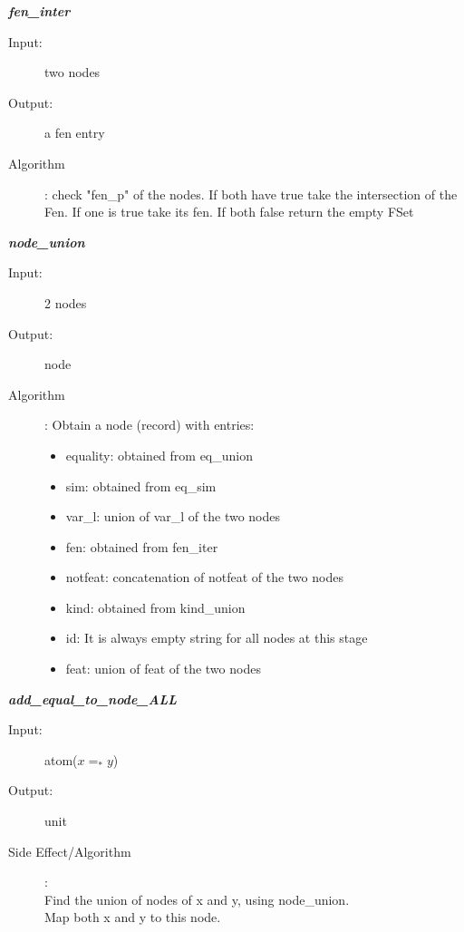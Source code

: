 \documentclass[12pt]{article}
\begin{document}
\begin{description}
\item \textbf{\textit{fen\_inter}}
\begin{description}
    \item[Input:] two nodes
    \item[Output:] a fen entry
    \item[Algorithm]: check "fen\_p" of the nodes. If both have true take the intersection of the Fen. If one is true take its fen. If both false return the empty FSet
\end{description}

\item \textbf{\textit{node\_union}}
\begin{description}
    \item[Input:] 2 nodes
    \item[Output:] node
    \item[Algorithm]: Obtain a node (record) with entries: 
    \begin{itemize}
	\item equality: obtained from eq\_union
	\item sim: obtained from eq\_sim
	\item var\_l: union of var\_l of the two nodes
	\item fen: obtained from fen\_iter
	\item notfeat: concatenation of notfeat of the two nodes
	\item kind: obtained from kind\_union
	\item id: It is always empty string for all nodes at this stage
	\item feat: union of feat of the two nodes
	\end{itemize}
\end{description}

\item \textbf{\textit{add\_equal\_to\_node\_ALL}}
\begin{description}
    \item[Input:] atom($x =_* y$)
    \item[Output:] unit
    \item[Side Effect/Algorithm]:\\ Find the union of nodes of x and y, using node\_union.\\
	Map both x and y to this node.\\
\end{description}


\end{description}
\end{document}
